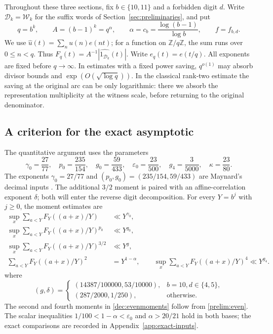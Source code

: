\documentclass[11pt,a4paper]{article}
\theoremstyle{paperplain}
\numberwithin{equation}{section}
\begin{document}
Throughout these three sections, fix $b\in\{10,11\}$ and a forbidden
digit $d$. Write $\mathcal D_k=\mathcal W_k$ for the suffix words of
Section~\ref{sec:preliminaries}, and put
\[
 q=b^k,\qquad A=(b-1)^k=q^\alpha,\qquad
 \alpha=c_b=\frac{\log(b-1)}{\log b},\qquad f=f_{b,d}.
\]
We use $\widehat u(t)=\sum_nu(n)e(nt)$; for a function on
$\mathbb Z/q\mathbb Z$, the sum runs over $0\le n<q$.
Thus $F_q(t)=A^{-1}|\widehat{1_{\mathcal D_k}}(t)|$.
Write $e_q(t)=e(t/q)$. All exponents are fixed before $q\to\infty$.
In estimates with a fixed power saving, $q^{o(1)}$ may absorb divisor
bounds and $\exp(O(\sqrt{\log q}))$. In the classical rank-two estimate
the saving at the original arc can be only logarithmic: there we absorb
the representation multiplicity at the witness scale, before returning
to the original denominator.

\subsection{A criterion for the exact asymptotic}
\label{dec:inputs}

The quantitative argument uses the parameters
\begin{equation}\label{dec:constants}
 \gamma_0=\frac{27}{77},\quad
 p_0=\frac{235}{154},\quad g_0=\frac{59}{433},\quad
 \varepsilon_0=\frac{23}{500},\quad g_4=\frac3{5000},\quad
 \kappa=\frac{23}{80}.
\end{equation}
The exponents $\gamma_0=27/77$ and
$(p_0,g_0)=(235/154,59/433)$ are Maynard's decimal inputs
\cite[Lemmas 10.3--10.4]{Maynard2019}.
The additional $3/2$ moment is paired with an affine-correlation
exponent $\delta$; both will enter the reverse digit decomposition.
For every $Y=b^j$ with $j\ge0$, the moment estimates are
\begin{align}
 \sup_x\sum_{a<Y}F_Y((a+x)/Y)&\ll Y^{\gamma_0},\label{dec:moment1}\\
 \sup_x\sum_{a<Y}F_Y((a+x)/Y)^{p_0}&\ll Y^{g_0},\label{dec:momentold}\\
 \sup_x\sum_{a<Y}F_Y((a+x)/Y)^{3/2}&\ll Y^{g},\label{dec:momentnew}\\
 \sum_{a<Y}F_Y((a+x)/Y)^2&=Y^{1-\alpha},\qquad
 \sup_x\sum_{a<Y}F_Y((a+x)/Y)^4\ll Y^{g_4}.
 \label{dec:evenmoments}
\end{align}
where
\begin{equation}\label{dec:groups}
 (g,\delta)=
 \begin{cases}
 (14387/100000, 53/10000),&b=10, d\in\{4,5\},\\
 (287/2000, 1/250),&\text{otherwise}.
 \end{cases}
\end{equation}
The second and fourth moments in \eqref{dec:evenmoments} follow from
\eqref{prelim:even}. The scalar inequalities
$1/100<1-\alpha<\varepsilon_0$ and $\alpha>20/21$ hold in both bases;
the exact comparisons are recorded in Appendix~\ref{app:exact-inputs}.
\end{document}
